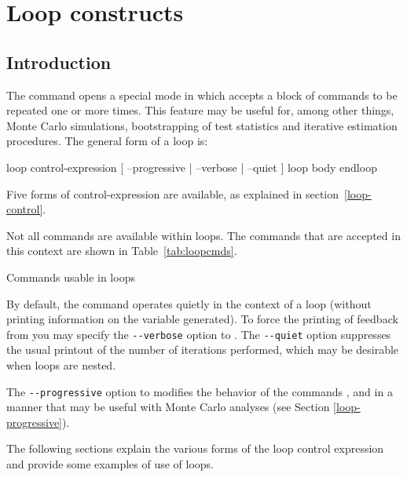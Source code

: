 \chapter{Loop constructs}
\label{chap:looping}

\section{Introduction}
\label{loop-intro}

The command  opens a special mode in which 
accepts a block of commands to be repeated one or more times.  This
feature may be useful for, among other things, Monte Carlo simulations,
bootstrapping of test statistics and iterative estimation procedures.
The general form of a loop is:

\begin{code}
      loop control-expression [ --progressive | --verbose | --quiet ]
         loop body
      endloop
\end{code}

Five forms of control-expression are available, as explained in
section~\ref{loop-control}.

Not all  commands are available within loops.  The commands
that are accepted in this context are shown in
Table~\ref{tab:loopcmds}.

\begin{table}[htbp]
\caption{Commands usable in loops}
\label{tab:loopcmds}
\begin{center}

\end{center}
\end{table}

By default, the  command operates quietly in the context of
a loop (without printing information on the variable generated).  To
force the printing of feedback from  you may specify the
\verb+--verbose+ option to .  The \verb+--quiet+ option
suppresses the usual printout of the number of iterations performed,
which may be desirable when loops are nested.

The \verb+--progressive+ option to  modifies the behavior of
the commands ,  and  in a manner that
may be useful with Monte Carlo analyses (see Section
\ref{loop-progressive}).
    
The following sections explain the various forms of the loop control
expression and provide some examples of use of loops.  

